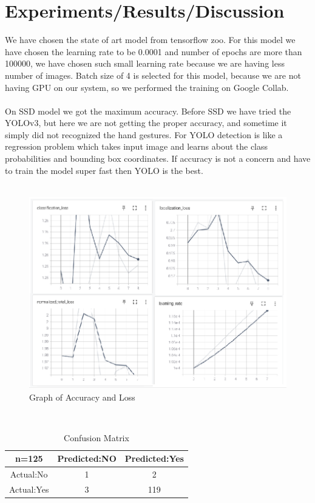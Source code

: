 \documentclass[12pt]{article}
\begin{document}
\section{Experiments/Results/Discussion}
We have chosen the state of art model from tensorflow zoo. For this model we have chosen the learning rate to be 0.0001 and number of epochs are more than 100000, we have chosen such small learning rate because we are having less number of images. Batch size of 4 is selected for this model, because we are not having GPU on our system, so we performed the training on Google Collab.\\
\\
On SSD model we got the maximum accuracy. Before SSD we have tried the YOLOv3, but here we are not getting the proper accuracy, and sometime it simply did not recognized the hand gestures. For YOLO detection is like a  regression problem which takes input image and learns about the class probabilities and bounding box coordinates. If accuracy is not a concern and have to train the model super fast then YOLO is the best.\cite{4}\\
\\
\begin{figure}[h]
\centering
\includegraphics[scale=0.55]{Graph.PNG}
\caption{Graph of Accuracy and Loss}
\label{Graph.PNG}
\end{figure}
\\
\begin{table}[ht]
\centering %
\begin{tabular}{|c|c|c|}
\hline %
n=125 & Predicted:NO & Predicted:Yes \\ %
\hline
Actual:No & 1 & 2 \\
\hline
Actual:Yes & 3 & 119 \\ [1ex] %
\hline %
\end{tabular}
\label{table:nonlin} %
\caption{Confusion Matrix}
\end{table}
\end{document}
